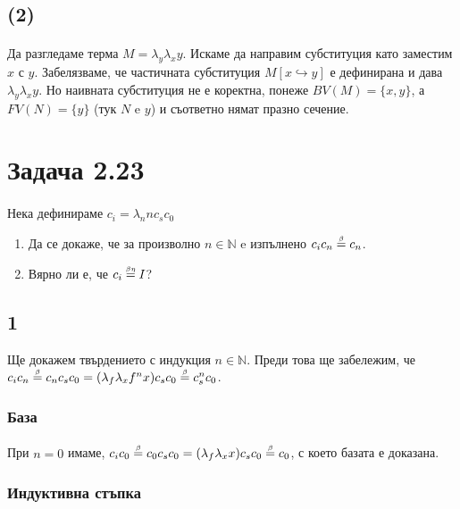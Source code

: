 \documentclass[12pt]{article}
\begin{document}
\begin{enumerate}
\subsection*{(2)}
\paragraph*{}
Да разгледаме терма $M = \lambda_y \lambda_x y$. Искаме да направим субституция като заместим $x$ с $y$. Забелязваме, че частичната субституция $M[x \hookrightarrow y]$ е дефинирана и дава $\lambda_y \lambda_x y$. Но наивната субституция не е коректна, понеже $BV(M) = \{ x, y \}$, а $FV(N) = \{ y \}$ (тук $N$ e $y$) и съответно нямат празно сечение.

\end{enumerate}

\section*{Задача 2.23}
\paragraph{}
Нека дефинираме $c_i = \lambda_n n c_s c_0$
\begin{enumerate}
	\item Да се докаже, че за произволно $n \in \mathbb{N}$ e изпълнено $c_i c_n \betaeq c_n$.
	\item Вярно ли е, че $c_i \betaetaeq I$?
\end{enumerate}

\subsection*{1}
Ще докажем твърдението с индукция $n \in \mathbb{N}$. Преди това ще забележим, че $c_i c_n \betaeq c_n c_s c_0 = (\lambda_f \lambda_x f^n x) c_s c_0 \betaeq c_s^n c_0 $.
\subsubsection*{База}
\paragraph*{}
При $n=0$ имаме, $c_i c_0 \betaeq c_0 c_s c_0 = (\lambda_f \lambda_x x) c_s c_0 \betaeq c_0$, с което базата е доказана.

\subsubsection*{Индуктивна стъпка}
\end{document}
